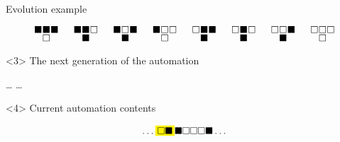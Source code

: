 \documentclass[presentation,aspectratio=169,smaller]{beamer}
\begin{document}
\begin{frame}[label={sec:org3545853},t]{Evolution example}
\begin{onlyenv}
\begin{equation*}
  \begingroup
  \setlength\arraycolsep{0.25pt}
  \renewcommand{\arraystretch}{0.5}
  \begin{matrix}
    \blacksquare & \blacksquare & \blacksquare \\
    & \square &
  \end{matrix}\mspace{28mu}
  \begin{matrix}
    \blacksquare & \blacksquare & \square \\
    & \blacksquare &
  \end{matrix}\mspace{28mu}
  \begin{matrix}
    \blacksquare & \square & \blacksquare \\
    & \blacksquare &
  \end{matrix}\mspace{28mu}
  \begin{matrix}
    \blacksquare & \square & \square \\
    & \square &
  \end{matrix}\mspace{28mu}
  \begin{matrix}
    \square & \blacksquare & \blacksquare \\
    & \blacksquare &
  \end{matrix}\mspace{28mu}
  \begin{matrix}
    \square & \blacksquare & \square \\
    & \blacksquare &
  \end{matrix}\mspace{28mu}
  \begin{matrix}
    \square & \square & \blacksquare \\
    & \blacksquare &
  \end{matrix}\mspace{28mu}
  \begin{matrix}
    \square & \square & \square \\
    & \square &
  \end{matrix}
  \endgroup
\end{equation*}
\end{onlyenv}

\begin{onlyenv}<3>
The next generation of the automation

\hfill \dots
\mspace{14mu} \mspace{14mu} \mspace{14mu} \mspace{14mu} \mspace{14mu} \mspace{14mu} \mspace{14mu}
\dots \hfill
\end{onlyenv}

\begin{onlyenv}<4>
Current automation contents

\begin{equation*}
  \hfill
  \dots
  \mathcolorbox{yellow}{%
    \square%
    \blacksquare%
  }%
  \blacksquare
  \square
  \square
  \square
  \blacksquare
  \dots
  \hfill
\end{equation*}


\end{onlyenv}
\end{frame}
\end{document}
